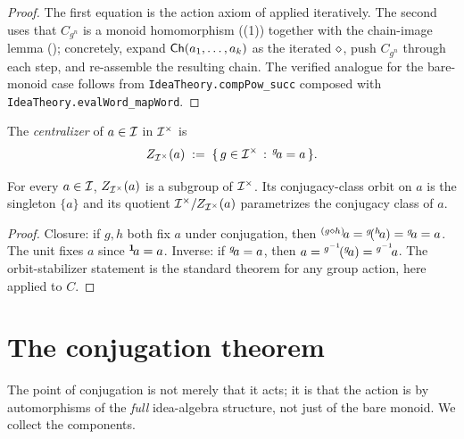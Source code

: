 \begin{proof}
The first equation is the action axiom of 
applied iteratively. The second uses that $C_{g^n}$ is a monoid
homomorphism ((1)) together with the
chain-image lemma (); concretely, expand
$\mathsf{Ch}(a_1,\dots,a_k)$ as the iterated $\mathbin{\diamond}$, push $C_{g^n}$
through each step, and re-assemble the resulting chain. The
verified analogue for the bare-monoid case follows from
\texttt{IdeaTheory.compPow\_succ} composed with
\texttt{IdeaTheory.evalWord\_mapWord}.
\end{proof}

\begin{definition}[Centralizer]\label{def:centralizer}
The \emph{centralizer} of $a\in\mathcal{I}$ in $\mathcal{I}^{\times}$ is
\[
  Z_{\mathcal{I}^{\times}}(a) \;\mathrel{:=}\; \{\,g\in\mathcal{I}^{\times}\,:\,
    {}^{g}\!a = a\,\}.
\]
\end{definition}

\begin{proposition}\label{prop:cent-sub}
For every $a\in\mathcal{I}$, $Z_{\mathcal{I}^{\times}}(a)$ is a subgroup of
$\mathcal{I}^{\times}$. Its conjugacy-class orbit on $a$ is the singleton
$\{a\}$ and its quotient $\mathcal{I}^{\times}/Z_{\mathcal{I}^{\times}}(a)$
parametrizes the conjugacy class of $a$.
\end{proposition}

\begin{proof}
Closure: if $g,h$ both fix $a$ under conjugation, then
${}^{(g\mathbin{\diamond} h)}\!a = {}^{g}\!({}^{h}\!a) = {}^{g}\!a = a$.
The unit fixes $a$ since ${}^{\mathbf{1}}\!a = a$. Inverse: if
${}^{g}\!a = a$, then $a = {}^{g^{-1}}\!({}^{g}\!a) =
{}^{g^{-1}}\!a$. The orbit-stabilizer statement is the standard
theorem for any group action, here applied to $C$.
\end{proof}

\section{The conjugation theorem}\label{sec:conj-thm}

The point of conjugation is not merely that it acts; it is that the
action is by automorphisms of the \emph{full} idea-algebra structure,
not just of the bare monoid. We collect the components.

